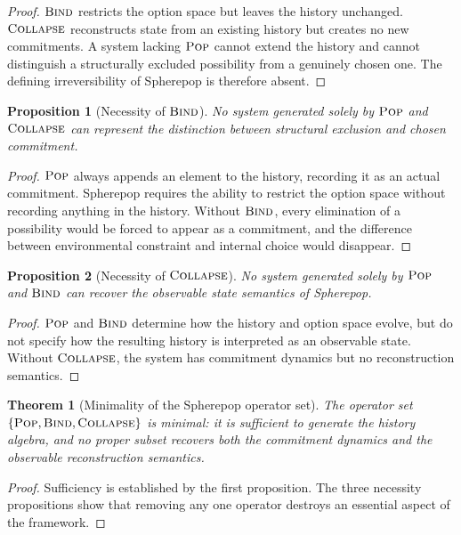 \documentclass[12pt]{article}
\newtheorem{theorem}{Theorem}[section]
\newtheorem{proposition}{Proposition}[section]
\newcommand{\Pop}{\operatorname{\textsc{Pop}}}
\newcommand{\Bind}{\operatorname{\textsc{Bind}}}
\newcommand{\Collapse}{\operatorname{\textsc{Collapse}}}
\begin{document}
\begin{proof}
$\Bind$ restricts the option space but leaves the history unchanged. $\Collapse$ reconstructs state from an existing history but creates no new commitments. A system lacking $\Pop$ cannot extend the history and cannot distinguish a structurally excluded possibility from a genuinely chosen one. The defining irreversibility of Spherepop is therefore absent.
\end{proof}

\begin{proposition}[Necessity of $\Bind$]
No system generated solely by $\Pop$ and $\Collapse$ can represent the distinction between structural exclusion and chosen commitment.
\end{proposition}

\begin{proof}
$\Pop$ always appends an element to the history, recording it as an actual commitment. Spherepop requires the ability to restrict the option space without recording anything in the history. Without $\Bind$, every elimination of a possibility would be forced to appear as a commitment, and the difference between environmental constraint and internal choice would disappear.
\end{proof}

\begin{proposition}[Necessity of $\Collapse$]
No system generated solely by $\Pop$ and $\Bind$ can recover the observable state semantics of Spherepop.
\end{proposition}

\begin{proof}
$\Pop$ and $\Bind$ determine how the history and option space evolve, but do not specify how the resulting history is interpreted as an observable state. Without $\Collapse$, the system has commitment dynamics but no reconstruction semantics.
\end{proof}

\begin{theorem}[Minimality of the Spherepop operator set]
The operator set $\{\Pop, \Bind, \Collapse\}$ is minimal: it is sufficient to generate the history algebra, and no proper subset recovers both the commitment dynamics and the observable reconstruction semantics.
\end{theorem}

\begin{proof}
Sufficiency is established by the first proposition. The three necessity propositions show that removing any one operator destroys an essential aspect of the framework.
\end{proof}
\end{document}
